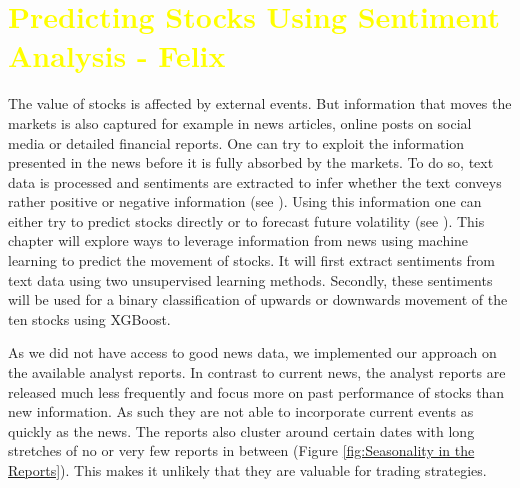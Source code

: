 \chapter{\textcolor{yellow}{Predicting Stocks Using Sentiment Analysis - Felix}} \label{ch:predictions_ml}
The value of stocks is affected by external events. But information that moves the markets is also captured for example in news articles, online posts on social media or detailed financial reports. One can try to exploit the information presented in the news before it is fully absorbed by the markets. To do so, text data is processed and sentiments are extracted to infer whether the text conveys rather positive or negative information (see \citet{HADDI201326}). Using this information one can either try to predict stocks directly or to forecast future volatility (see \citet{robertson2007news}). This chapter will explore ways to leverage information from news using machine learning to predict the movement of stocks. It will first extract sentiments from text data using two unsupervised learning methods. Secondly, these sentiments will be used for a binary classification of upwards or downwards movement of the ten stocks using XGBoost.

As we did not have access to good news data, we implemented our approach on the available analyst reports. In contrast to current news, the analyst reports are released much less frequently  and focus more on past performance of stocks than new information. As such they are not able to incorporate current events as quickly as the news. The reports also cluster around certain dates with long stretches of no or very few reports in between (Figure \ref{fig:Seasonality in the Reports}). This makes it unlikely that they are valuable for trading strategies.
\\ 
